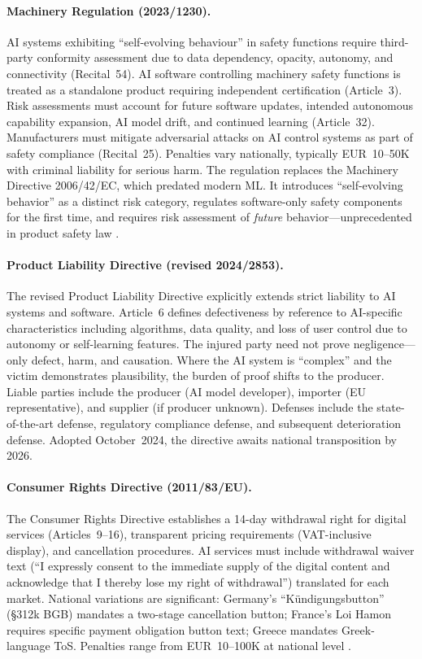 \documentclass[11pt,a4paper]{article}
\begin{document}
\paragraph{Machinery Regulation (2023/1230).}
AI systems exhibiting ``self-evolving behaviour'' in safety functions require third-party conformity assessment due to data dependency, opacity, autonomy, and connectivity (Recital~54). AI software controlling machinery safety functions is treated as a standalone product requiring independent certification (Article~3). Risk assessments must account for future software updates, intended autonomous capability expansion, AI model drift, and continued learning (Article~32). Manufacturers must mitigate adversarial attacks on AI control systems as part of safety compliance (Recital~25). Penalties vary nationally, typically EUR~10--50K with criminal liability for serious harm. The regulation replaces the Machinery Directive 2006/42/EC, which predated modern ML. It introduces ``self-evolving behavior'' as a distinct risk category, regulates software-only safety components for the first time, and requires risk assessment of \emph{future} behavior---unprecedented in product safety law \cite{machinery}.

\paragraph{Product Liability Directive (revised 2024/2853).}
The revised Product Liability Directive explicitly extends strict liability to AI systems and software. Article~6 defines defectiveness by reference to AI-specific characteristics including algorithms, data quality, and loss of user control due to autonomy or self-learning features. The injured party need not prove negligence---only defect, harm, and causation. Where the AI system is ``complex'' and the victim demonstrates plausibility, the burden of proof shifts to the producer. Liable parties include the producer (AI model developer), importer (EU representative), and supplier (if producer unknown). Defenses include the state-of-the-art defense, regulatory compliance defense, and subsequent deterioration defense. Adopted October~2024, the directive awaits national transposition by 2026.

\paragraph{Consumer Rights Directive (2011/83/EU).}
The Consumer Rights Directive establishes a 14-day withdrawal right for digital services (Articles~9--16), transparent pricing requirements (VAT-inclusive display), and cancellation procedures. AI services must include withdrawal waiver text (``I expressly consent to the immediate supply of the digital content and acknowledge that I thereby lose my right of withdrawal'') translated for each market. National variations are significant: Germany's ``K\"undigungsbutton'' (\S312k BGB) mandates a two-stage cancellation button; France's Loi Hamon requires specific payment obligation button text; Greece mandates Greek-language ToS. Penalties range from EUR~10--100K at national level \cite{consumerrights}.
\end{document}
